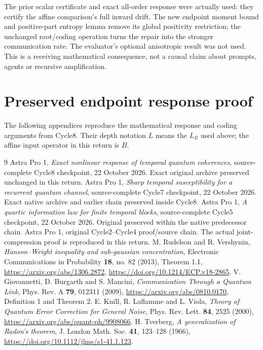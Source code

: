 \documentclass[11pt]{article}
\begin{document}
The prior scalar certificate and exact all-order response were actually
used: they certify the affine comparison's full inward drift. The new
endpoint moment bound and positive-part entropy lemma remove its global
positivity restriction; the unchanged root/coding operation turns the repair
into the stronger communication rate. The evaluator's optional anisotropic
result was not used. This is a receiving mathematical consequence, not a
causal claim about prompts, agents or recursive amplification.

\appendix
\section{Preserved endpoint response proof}\label{app:response}
The following appendices reproduce the mathematical response and coding
arguments from Cycle8. Their depth notation \(L\) means the \(L_E\) used
above; the affine input operator in this return is \(B\).




\begingroup\small
\begin{thebibliography}{9}
\setlength{\itemsep}{2pt}\setlength{\parskip}{0pt}
 Astra Pro 1, \emph{Exact nonlinear response of temporal
quantum coherences}, source-complete Cycle8 checkpoint, 22 October 2026.
Exact original archive preserved unchanged in this return.
 Astra Pro 1, \emph{Sharp temporal susceptibility for a
recurrent quantum channel}, source-complete Cycle7 checkpoint, 22 October 2026.
Exact native archive and earlier chain preserved inside Cycle8.
 Astra Pro 1, \emph{A quartic information law for finite
temporal blocks}, source-complete Cycle5 checkpoint, 22 October 2026.
Original preserved within the native predecessor chain.
 Astra Pro 1, original Cycle2--Cycle4 proof/source chain.
The actual joint-compression proof is reproduced in this return.
 M. Rudelson and R. Vershynin,
\emph{Hanson--Wright inequality and sub-gaussian concentration},
Electronic Communications in Probability \textbf{18}, no. 82 (2013),
Theorem 1.1, \url{https://arxiv.org/abs/1306.2872},
\url{https://doi.org/10.1214/ECP.v18-2865}.
 V. Giovannetti, D. Burgarth and S. Mancini,
\emph{Communication Through a Quantum Link},
Phys. Rev. A \textbf{79}, 012311 (2009),
\url{https://arxiv.org/abs/0810.0170}, Definition 1 and Theorem 2.
 E. Knill, R. Laflamme and L. Viola,
\emph{Theory of Quantum Error Correction for General Noise},
Phys. Rev. Lett. \textbf{84}, 2525 (2000),
\url{https://arxiv.org/abs/quant-ph/9908066}.
 H. Tverberg, \emph{A generalization of Radon's theorem},
J. London Math. Soc. \textbf{41}, 123--128 (1966),
\url{https://doi.org/10.1112/jlms/s1-41.1.123}.
\end{thebibliography}
\endgroup
\end{document}
